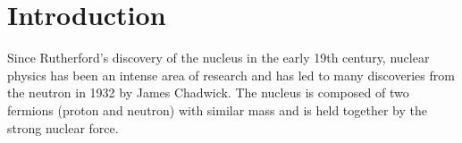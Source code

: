 \section{Introduction}
Since Rutherford’s discovery of the nucleus in the early 19th century,\cite{noauthor_discovery_nodate} nuclear physics has been an intense area of research and has led to many discoveries from the neutron in 1932 by James Chadwick.
The nucleus is composed of two fermions (proton and neutron) with similar mass and is held together by the strong nuclear force.

